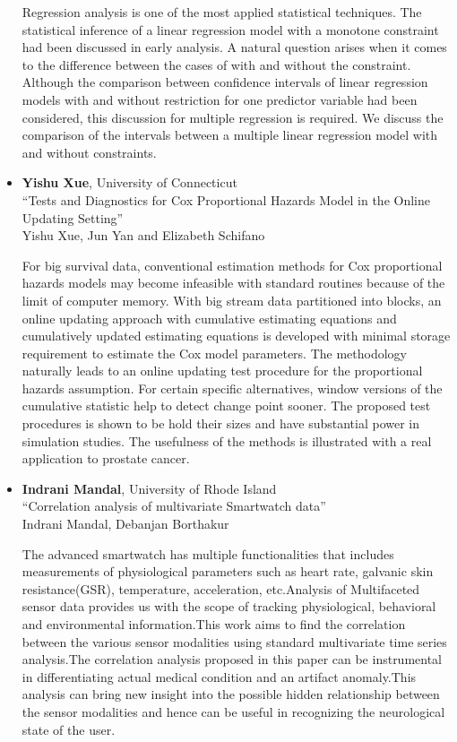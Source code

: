 \begin{itemize}
Regression analysis is one of the most applied statistical techniques. The statistical inference of a linear regression model with a monotone constraint had been discussed in early analysis. A natural question arises when it comes to the difference between the cases of with and without the constraint. Although the comparison between confidence intervals of linear regression models with and without restriction for one predictor variable had been considered, this discussion for multiple regression is required.
We discuss the comparison of the intervals between a multiple linear regression model with and without constraints.

\item \textbf{Yishu Xue}, University of Connecticut \\
``Tests and Diagnostics for Cox Proportional Hazards Model in the Online Updating Setting'' \\
Yishu Xue, Jun Yan and Elizabeth Schifano


For big survival data, conventional estimation methods for Cox
proportional hazards models may become infeasible with standard
routines because of the limit of computer memory. With big stream data
partitioned into blocks, an online updating approach with cumulative
estimating equations and cumulatively updated estimating equations is
developed with minimal storage requirement to estimate the Cox model
parameters. The methodology naturally leads to an online updating test
procedure for the proportional hazards assumption. For certain
specific alternatives, window versions of the cumulative statistic
help to detect change point sooner. The proposed test procedures is
shown to be hold their sizes and have substantial power in simulation
studies. The usefulness of the methods is illustrated with a real
application to prostate cancer.

\item \textbf{Indrani Mandal}, University of Rhode Island \\
``Correlation analysis of multivariate Smartwatch data'' \\
Indrani Mandal, Debanjan Borthakur


The advanced smartwatch has multiple functionalities that includes measurements of physiological parameters such as heart rate, galvanic skin resistance(GSR), temperature, acceleration, etc.Analysis of Multifaceted sensor data provides us with the scope of tracking physiological, behavioral and environmental information.This work aims to find the correlation between the various sensor modalities using standard multivariate time series analysis.The correlation analysis proposed in this paper can be instrumental in differentiating actual medical condition and an artifact anomaly.This analysis can bring new insight into the possible hidden relationship between the sensor modalities and hence can be useful in recognizing the neurological state of the user.


\end{itemize}
